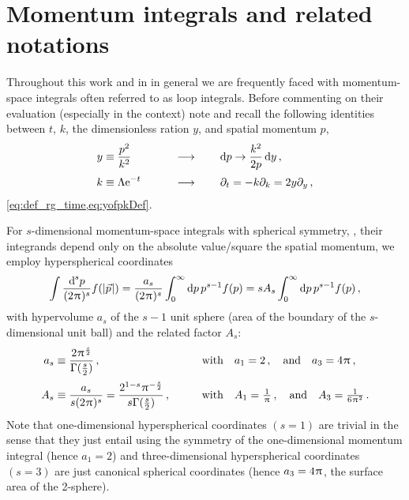 \section{Momentum integrals and related notations}\label{app:momInt}
Throughout this work and in \qft{} in general we are frequently faced with momentum-space integrals \dash{} often referred to as loop integrals.
Before commenting on their evaluation (especially in the \frg{} context) note and recall the following identities between \rgtime{} $t$, \rgscale{} $k$, the dimensionless ration $y$, and spatial momentum $p$,
\begin{alignat}{2}
	y&\equiv \frac{p^2}{k^2} \qquad &&\longrightarrow \qquad \dif p \rightarrow \frac{k^2}{2p}\dif y\, ,\label{eq:yId}\\[0.2em]
	k&\equiv \Lambda \eu^{-t} \qquad &&\longrightarrow \qquad \partial_t = -k \partial_k = 2 y \partial_y \, ,\label{eq:ktyId}
\end{alignat}
\cf{} \cref{eq:def_rg_time,eq:yofpkDef}.

For $s$-dimensional momentum-space integrals with spherical symmetry, \ie{}, their integrands depend only on the absolute value/square the spatial momentum, we employ hyperspherical coordinates
\begin{align}
\int\frac{\dif^{\,s}\! p}{(2\piu)^s}f(|\vec{p}\vts|) = \frac{a_s}{(2\piu)^s}\int_0^\infty \dif p\, p^{s-1}f(p)=s A_s\int_0^\infty \dif p\, p^{s-1}f(p)\, ,\label{eq:sphericalCords}
\end{align}
with hypervolume $a_s$ of the $s-1$ unit sphere (area of the boundary of the $s$-dimensional unit ball) and the related factor $A_s$:
\begin{alignat}{2}
	a_s&\equiv \frac{2\mkern1.0mu\uppi\mkern1.0mu^\frac{s}{2}}{\Gamma(\tfrac{s}{2})}\, ,\qquad &&\text{with} \quad a_1=2\,, \quad\text{and}\quad a_3=4\mkern1.0mu\uppi\mkern1.0mu\, ,\label{eq:asDef}\\[.2em]
	A_s&\equiv\frac{a_s}{s(2\mkern1.0mu\uppi\mkern1.0mu)^s}= \frac{2^{1-s}\mkern1.0mu\uppi\mkern1.0mu^{-\frac{s}{2}}}{s\Gamma(\tfrac{s}{2})}\, ,\qquad &&\text{with} \quad A_1=\tfrac{1}{\mkern1.0mu\uppi\mkern1.0mu}\,, \quad\text{and}\quad A_3=\tfrac{1}{6\mkern1.0mu\uppi\mkern1.0mu^2}\, .\label{eq:AsDef}
\end{alignat}
Note that one-dimensional hyperspherical coordinates $(s=1)$ are trivial in the sense that they just entail using the \ZII{} symmetry of the one-dimensional momentum integral (hence $a_1=2$) and three-dimensional hyperspherical coordinates $(s=3)$ are just canonical spherical coordinates (hence $a_3=4\mkern1.0mu\uppi\mkern1.0mu$, \viz{} the surface area of the 2-sphere).\bigskip

